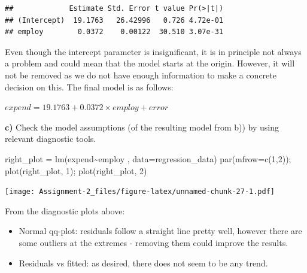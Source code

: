 \documentclass[
  10pt,
]{article}
\newenvironment{Shaded}{\begin{snugshade}}{\end{snugshade}}
\newcommand{\AttributeTok}[1]{\textcolor[rgb]{0.77,0.63,0.00}{#1}}
\newcommand{\DecValTok}[1]{\textcolor[rgb]{0.00,0.00,0.81}{#1}}
\newcommand{\FunctionTok}[1]{\textcolor[rgb]{0.00,0.00,0.00}{#1}}
\newcommand{\NormalTok}[1]{#1}
\newcommand{\OtherTok}[1]{\textcolor[rgb]{0.56,0.35,0.01}{#1}}
\newcommand{\SpecialCharTok}[1]{\textcolor[rgb]{0.00,0.00,0.00}{#1}}
\providecommand{\tightlist}{%
  \setlength{\itemsep}{0pt}\setlength{\parskip}{0pt}}
\begin{document}
\begin{Shaded}
\end{Shaded}

\begin{verbatim}
##             Estimate Std. Error t value Pr(>|t|)
## (Intercept)  19.1763   26.42996   0.726 4.72e-01
## employ        0.0372    0.00122  30.510 3.07e-31
\end{verbatim}

Even though the intercept parameter is insignificant, it is in principle
not always a problem and could mean that the model starts at the origin.
However, it will not be removed as we do not have enough information to
make a concrete decision on this. The final model is as follows:

\(expend = 19.1763 + 0.0372 \times employ + error\)

\textbf{c)} Check the model assumptions (of the resulting model from b))
by using relevant diagnostic tools.

\begin{Shaded}
\begin{Highlighting}[]
\NormalTok{right\_plot }\OtherTok{=} \FunctionTok{lm}\NormalTok{(expend}\SpecialCharTok{\textasciitilde{}}\NormalTok{employ , }\AttributeTok{data=}\NormalTok{regression\_data)}
\FunctionTok{par}\NormalTok{(}\AttributeTok{mfrow=}\FunctionTok{c}\NormalTok{(}\DecValTok{1}\NormalTok{,}\DecValTok{2}\NormalTok{)); }\FunctionTok{plot}\NormalTok{(right\_plot, }\DecValTok{1}\NormalTok{); }\FunctionTok{plot}\NormalTok{(right\_plot, }\DecValTok{2}\NormalTok{)}
\end{Highlighting}
\end{Shaded}

\texttt{[image: Assignment-2\_files/figure-latex/unnamed-chunk-27-1.pdf]}

From the diagnostic plots above:

\begin{itemize}
\tightlist
\item
  Normal qq-plot: residuals follow a straight line pretty well, however
  there are some outliers at the extremes - removing them could improve
  the results.
\item
  Residuals vs fitted: as desired, there does not seem to be any trend.
\end{itemize}
\end{document}
